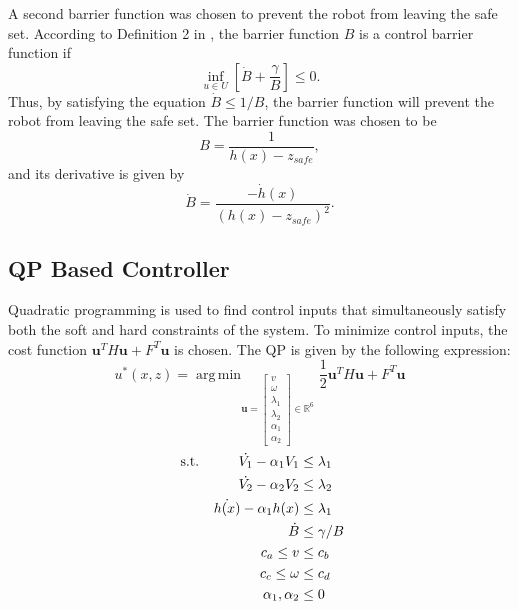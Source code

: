 \documentclass[conference]{IEEEtran}
\DeclareMathOperator*{\argmin}{arg\,min}
\begin{document}
A second barrier function was chosen to prevent the robot from leaving the safe set. According to Definition 2 in \cite{amesACC}, the barrier function $B$ is a control barrier function if 
\begin{equation}
\inf_{u\in U}\left[ \dot{B}+\frac{\gamma}{B} \right] \leq 0.
\label{eq:cbf}
\end{equation}
Thus, by satisfying the equation $\dot{B}\leq 1/B$, the barrier function will prevent the robot from leaving the safe set. The barrier function was chosen to be
\begin{equation}
B=\frac{1}{h(x)-z_{safe}},
\label{bf}
\end{equation}
and its derivative is given by
\begin{equation}
\dot{B}=\frac{-\dot{h}(x)}{(h(x)-z_{safe})^2}.
\end{equation}

\subsection{QP Based Controller}
Quadratic programming is used to find control inputs that simultaneously satisfy both the soft and hard constraints of the system. To minimize control inputs, the cost function $\textbf{u}^TH\textbf{u}+F^T\textbf{u}$ is chosen. The QP is given by the following expression:
\begin{equation}
u^*(x,z) = \argmin_{\textbf{u}=
\left[\begin{matrix}
v\\
\omega\\
\lambda_1\\
\lambda_2\\
\alpha_1\\
\alpha_2
\end{matrix}\right]
\in \mathbb{R}^6}
\frac{1}{2}\textbf{u}^TH\textbf{u}+F^T\textbf{u} 
\label{QP}
\end{equation}
\begin{align}
\text{ s.t.\hspace{1cm}}
\dot{V_1} -\alpha_1 V_1 & \leq\lambda_1\\
\dot{V_2} -\alpha_2 V_2 & \leq\lambda_2\\
\dot{h(x)}-\alpha_1 h(x) & \leq \lambda_1\\
\dot{B} & \leq \gamma/B\\
c_a \leq v & \leq c_b\\
c_c\leq \omega & \leq c_d\\
\alpha_1,\alpha_2 & \leq 0
\end{align}
\end{document}
